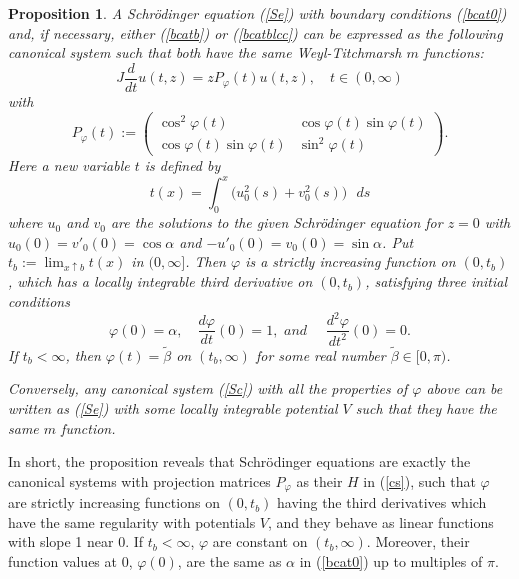 \documentclass[preprint,12pt]{elsarticle}
\newtheorem{Proposition}[Theorem]{Proposition}
\begin{document}
\begin{Proposition}
\label{Cor}
A Schr\"odinger equation (\ref{Se}) with boundary conditions (\ref{bcat0}) and, if necessary, either (\ref{bcatb}) or (\ref{bcatblcc}) can be expressed as the following canonical system such that both have the same Weyl-Titchmarsh $m$ functions: 
\begin{equation}\label{Sc}
J \frac{d}{dt}u(t,z)=z P_{\varphi}(t) u(t,z) , \quad t\in(0,\infty) 
\end{equation} 
with 
\begin{equation}
\label{HforS}
P_{\varphi}(t):=\begin{pmatrix} \cos^2\varphi(t) & \cos \varphi(t) \sin \varphi(t) \\ \cos \varphi(t) \sin \varphi(t) & \sin^2\varphi(t) \end{pmatrix}. 
\end{equation}
Here a new variable $t$ is defined by 
\begin{equation}
\label{t}
t(x)=\int_0^x \big( u_{0}^2(s)+v_{0}^2(s) \big) \textrm{ }ds
\end{equation}
where $u_{0}$ and $v_{0}$ are the solutions to the given Schr\"odinger equation for $z=0$ with $u_0(0)=v'_0(0)=\cos\alpha$ and $-u'_0(0)=v_0(0)=\sin\alpha$. 
Put $t_b:= \lim_{x\uparrow b}t(x)$ in $(0,\infty]$. Then $\varphi$ is a strictly increasing function on $(0,t_b)$, which has a locally integrable third derivative on $(0,t_b)$, satisfying three initial conditions
\begin{equation}\label{initialcondition}
 \varphi(0)=\alpha,\quad \frac{d\varphi}{dt}(0)=1, \textit{ and }\quad \frac{d^2\varphi}{dt^2}(0)=0.
\end{equation}
If $t_b<\infty$, then $\varphi(t)=\tilde{\beta}$ on $(t_b, \infty)$ for some real number $\tilde{\beta}\in [0,\pi)$. 

Conversely, any canonical system (\ref{Sc}) with all the properties of $\varphi$ above can be written as (\ref{Se}) with some locally integrable potential $V$ such that they have the same $m$ function.\\
\end{Proposition}

In short, the proposition reveals that Schr\"odinger equations are exactly the canonical systems with  projection matrices $P_{\varphi}$ as their $H$ in (\ref{cs}), such that $\varphi$ are strictly increasing functions on $(0,t_b)$ having the third derivatives which have the same regularity with potentials $V$, and they behave as linear functions with slope 1 near 0. If $t_b<\infty$, $\varphi$ are constant on $(t_b,\infty)$. Moreover, their function values at 0, $\varphi(0)$, are the same as $\alpha$ in (\ref{bcat0}) up to multiples of $\pi$. 
\end{document}
